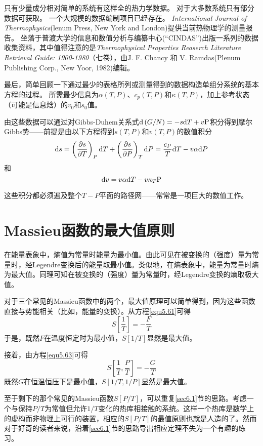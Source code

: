 只有少量成分相对简单的系统有这样全的热力学数据。
对于大多数系统只有部分数据可获取。
一个大规模的数据编制项目已经存在。
\textit{International Journal of Thermophysics}(lenum Press, New York and London)提供当前热物理学的测量报告。
坐落于普渡大学的信息和数值分析与编纂中心(“CINDAS”)出版一系列的数据收集资料，其中值得注意的是\textit{Thermophysical Properties Reaserch Literature Retrieval Guide: 1900-1980}（七卷），由J. F. Chancy 和 V. Ramdas(Plenum Publishing Corp., New Yoor, 1982)编辑。

最后，简单回顾一下通过最少的表格所列或测量得到的数据构造单组分系统的基本方程的过程。
所需最少信息为$\alpha(T,P)$、$c_p(T,P)$和$\kappa(T,P)$，加上参考状态（可能是信息焓）的$v_0$和$s_0$值。

由这些数据可以通过对Gibbs-Duhem关系式$\mathrm{d} \left(G/N\right)=-s\mathrm{d} T+v\text{P}$积分得到摩尔Gibbs势——前提是由以下方程得到$s(T,P)$和$v(T,P)$的数值积分
\[\mathrm{d} s=\left(\frac{\partial s}{\partial T}\right)_P\mathrm{d} T+\left(\frac{\partial s}{\partial P}\right)_T\mathrm{d} P=\frac{c_P}{T}\mathrm{d} T-v\alpha\mathrm{d} P\]
和
\[\mathrm{d} v=v\alpha\mathrm{d} T-v\kappa_T\text{P}\]

这些积分都必须遍及整个$T-P$平面的路径网——常常是一项巨大的数值工作。

\section{Massieu函数的最大值原则}
\label{sec6.7}

在能量表象中，熵值为常量时能量为最小值。由此可见在被变换的（强度）量为常量时，经Legendre变换后的能量取最小值。类似地，在熵表象中，能量为常量时熵为最大值。同理可知在被变换的（强度）量为常量时，经Legendre变换的熵取极大值。%

对于三个常见的Massieu函数中的两个，最大值原理可以简单得到，因为这些函数直接与势能相关（比如，能量的变换）。从方程\eqref{equ5.61}可得
\begin{equation}
	S\left[\frac{1}{T}\right]=-\frac{F}{T}
\end{equation}
于是，既然$F$在温度恒定时为最小值，$S[1/T]$显然是最大值。

接着，由方程\eqref{equ5.63}可得
\begin{equation}
	S\left[\frac{1}{T},\frac{P}{T}\right]=-\frac{G}{T}
\end{equation}
既然$G$在恒温恒压下是最小值，$S[1/T,1/P]$显然是最大值。

至于剩下的那个常见的Massieu函数$S[P/T]$，可以重复\ref{sec6.1}节的思路。考虑一个与保持$P/T$为常值但允许$1/T$变化的热库相接触的系统。这样一个热库是数学上的虚构而非物理上可行的装置，相应的$S[P/T]$的最值原则也就是人造的了。然而对于好奇的读者来说，沿着\ref{sec6.1}节的思路导出相应定理不失为一个有趣的练习。